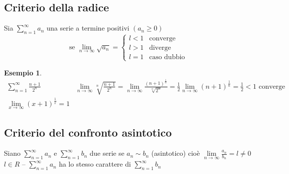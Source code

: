 \documentclass{book}
\newtheorem{esempio}{Esempio}
\begin{document}
\subsection{Criterio della radice}
Sia $\sum_{n=1}^\infty a_n$ una serie a termine positivi $(a_n\geq 0)$
\begin{equation*}
  \text{se }\lim_{n\to \infty} \sqrt{a_n}=\begin{cases}
                                            l<1 & \text{converge}\\
                                            l>1 & \text{diverge}\\
                                            l=1 & \text{caso dubbio}
                                          \end{cases}
\end{equation*}
\begin{esempio}
	\begin{eqnarray*}
		\displaystyle\sum_{n=1}^{\infty}\frac{n+1}{2^n} & \lim\limits_{n\to
		\infty}
		\sqrt[n]{\frac{n+1}{2^n}}=\lim\limits_{n\to\infty}
		\frac{(n+1)^{\frac{1}{n}}}{\sqrt[n]{2^n}}=\frac{1}{2}\lim_{n\to \infty}
		(n+1)^\frac{1}{n}=\frac{1}{2}<1 \text{ converge}\\
		\lim\limits_{x\to \infty} (x+1)^\frac{1}{x}=1
	\end{eqnarray*}
\end{esempio}
\subsection{Criterio del confronto asintotico}
Siano $\displaystyle\sum_{n=1}^\infty a_n$ e $\displaystyle\sum_{n=1}^\infty b_n$ due serie se $a_n\sim
b_n$ (asintotico) cioè $\lim\limits_{n\to \infty}\frac{a_n}{b_n}=l\neq 0$ $l\in
R$ -- $\displaystyle\sum_{n=1}^{\infty}a_n$ ha lo stesso carattere di $\displaystyle\sum_{n=1}^\infty b_n$
\end{document}
